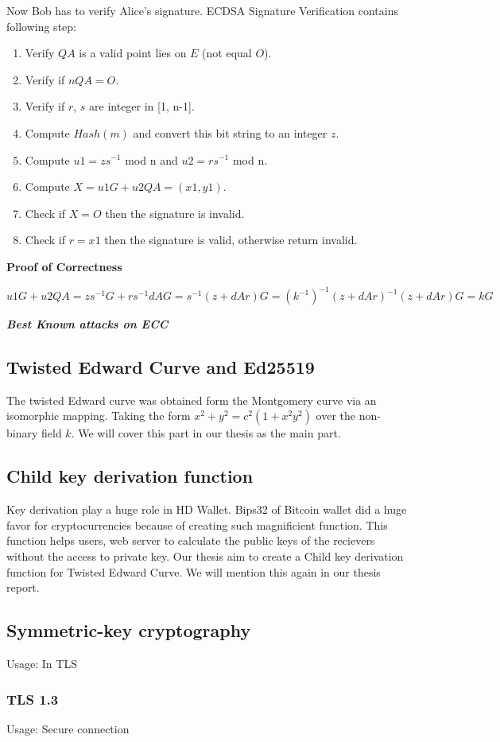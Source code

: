 Now Bob has to verify Alice's signature. ECDSA Signature Verification contains following step:
\begin{enumerate}
  \item Verify $QA$ is a valid point lies on $E$ (not equal $O$).
  \item Verify if $nQA = O$.
  \item Verify if $r$, $s$ are integer in [1, n-1].
  \item Compute $Hash(m)$ and convert this bit string to an integer $z$.
  \item Compute $u1=zs^{-1}$ mod n and $u2= rs^{-1}$ mod n.
  \item Compute $X = u1G + u2QA = (x1, y1)$.
  \item Check if $X = O$ then the signature is invalid.
  \item Check if $r = x1$ then the signature is valid, otherwise return invalid.
\end{enumerate}

{\textbf{Proof of Correctness}}

$u1G + u2QA = zs^{-1}G + rs^{-1}dAG = s^{-1}(z+dAr)G =(k^{-1})^{-1}(z+dAr)^{-1}(z+dAr)G = kG$

\bigskip
{\textit {\textbf{Best Known attacks on ECC}}}

\subsection{Twisted Edward Curve and Ed25519}
The twisted Edward curve was obtained form the Montgomery curve via an isomorphic mapping.
Taking the form $x^2 + y^2 = c^2(1+ x^2y^2)$ over the non-binary field $k$.
We will cover this part in our thesis as the main part.

\subsection{Child key derivation function}
Key derivation play a huge role in HD Wallet.
Bips32 of Bitcoin wallet did a huge favor for cryptocurrencies because of creating such magnificient function.
This function helps users, web server to calculate the public keys of the recievers without the access to private key.
Our thesis aim to create a Child key derivation function for Twisted Edward Curve.
We will mention this again in our thesis report.

\subsection{Symmetric-key cryptography}
\label{sec: Symmetric_keys}
Usage: In TLS

\subsubsection{TLS 1.3}
Usage: Secure connection


